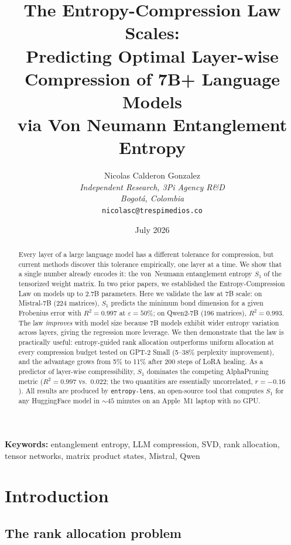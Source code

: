 \documentclass[11pt,a4paper]{article}
\title{%
  \textbf{The Entropy-Compression Law Scales:\\[4pt]
  Predicting Optimal Layer-wise Compression of 7B+ Language Models\\[2pt]
  via Von Neumann Entanglement Entropy}}
\author{
  Nicolas Calderon Gonzalez \\[2pt]
  \textit{Independent Research, 3Pi Agency R\&D} \\
  \textit{Bogot\'a, Colombia} \\
  \texttt{nicolasc@trespimedios.co}
}
\date{July 2026}
\newcommand{\Svn}{S_1}
\begin{document}
\maketitle

\begin{abstract}
Every layer of a large language model has a different tolerance for
compression, but current methods discover this tolerance empirically,
one layer at a time.  We show that a single number already encodes
it: the von~Neumann entanglement entropy $\Svn$ of the tensorized
weight matrix.  In two prior papers, we established the
Entropy-Compression Law on models up to 2.7B parameters.
Here we validate the law at 7B scale: on Mistral-7B (224 matrices),
$\Svn$ predicts the minimum bond dimension for a given Frobenius
error with $R^2 = 0.997$ at $\varepsilon = 50\%$; on Qwen2-7B (196
matrices), $R^2 = 0.993$.  The law \emph{improves} with model size
because 7B models exhibit wider entropy variation across layers,
giving the regression more leverage.  We then demonstrate that the
law is practically useful: entropy-guided rank allocation
outperforms uniform allocation at every compression budget tested on
GPT-2 Small (5--38\% perplexity improvement), and the advantage
grows from 5\% to 11\% after 200 steps of LoRA healing.  As a
predictor of layer-wise compressibility, $\Svn$ dominates the
competing AlphaPruning metric ($R^2 = 0.997$ vs.\ $0.022$; the two
quantities are essentially uncorrelated, $r = -0.16$).  All results
are produced by \texttt{entropy-lens}, an open-source tool that
computes $\Svn$ for any HuggingFace model in ${\sim}45$ minutes on
an Apple~M1 laptop with no GPU.
\end{abstract}

\vspace{0.5em}
\noindent\textbf{Keywords:}
entanglement entropy, LLM compression, SVD, rank allocation,
tensor networks, matrix product states, Mistral, Qwen

\section{Introduction}
\label{sec:intro}

\subsection{The rank allocation problem}
\label{sec:intro-problem}
\end{document}
